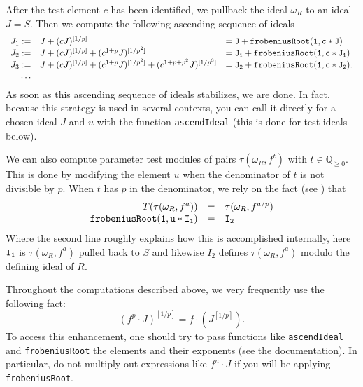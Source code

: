 \documentclass[11pt]{amsart}
\begin{document}
After the test element $c$ has been identified, we pullback the ideal $\omega_R$ to an ideal $J = S$.  Then we compute the following ascending sequence of ideals
\begin{equation}
\label{eq.AscendIdealExplanation}
\begin{array}{rll}
J_1 := &  J + (c J)^{[1/p]} & = {\tt J + frobeniusRoot(1, c*J)}\\
J_2 := & J + (c J)^{[1/p]} + (c^{1+p} J)^{[1/p^2]} & = {\tt J_1 + frobeniusRoot(1, c*J_1)}\\
J_3 := & J + (c J)^{[1/p]} + (c^{1+p} J)^{[1/p^2]} + (c^{1+p+p^2} J)^{[1/p^3]} & = {\tt J_2 + frobeniusRoot(1, c*J_2)}.\\
\dots
\end{array}
\end{equation}
As soon as this ascending sequence of ideals stabilizes, we are done.
In fact, because this strategy is used in several contexts, you can call it directly for a chosen ideal $J$ and $u$ with the function \texttt{ascendIdeal} (this is done for test ideals below).

We can also compute parameter test modules of pairs $\tau(\omega_R, f^{t})$ with $t \in \mathbb{Q}_{\geq 0}$.  This is done by modifying the element $u$ when the denominator of $t$ is not divisible by $p$.  When $t$ has $p$ in the denominator, we rely on the fact (see \cite{BlickleMustataSmithDiscretenessAndRationalityOfFThresholds,SchwedeTuckerTestIdealFiniteMaps}) that
\[
\begin{array}{rcl}
T(\tau(\omega_R, f^a)) & = & \tau(\omega_R, f^{a/p})\\
{\tt frobeniusRoot(1, u*I_1)} & {\tt =} & {\tt I_2}
\end{array}
\]
Where the second line roughly explains how this is accomplished internally, here ${\tt I_1}$ is $\tau(\omega_R, f^a)$ pulled back to $S$ and likewise $I_2$ defines $\tau(\omega_R, f^a)$ modulo the defining ideal of $R$.

\begin{remark}
Throughout the computations described above, we very frequently use the following fact:
\[
(f^p \cdot J)^{[1/p]} = f \cdot (J^{[1/p]}).
\]
To access this enhancement, one should try to pass functions like \texttt{ascendIdeal} and \texttt{frobeniusRoot} the elements and their exponents (see the documentation).  In particular, do not multiply out expressions like $f^n \cdot J$ if you will be applying \texttt{frobeniusRoot}.
\end{remark}
\end{document}
